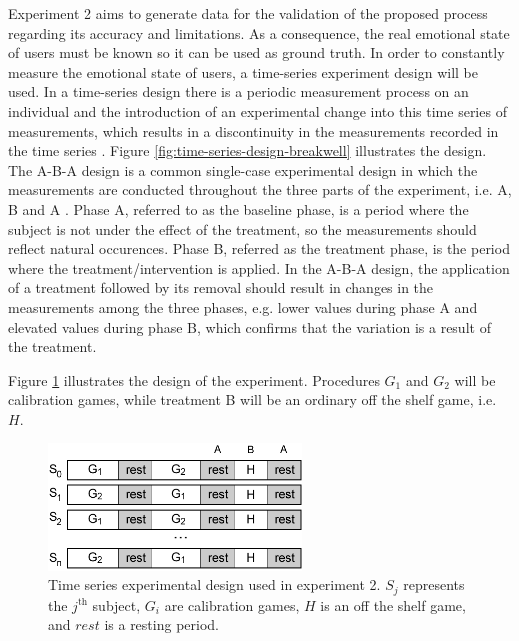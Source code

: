 Experiment 2 aims to generate data for the validation of the proposed process regarding its accuracy and limitations. As a consequence, the real emotional state of users must be known so it can be used as ground truth. In order to constantly measure the emotional state of users, a time-series experiment design will be used. In a time-series design there is a periodic measurement process on an individual and the introduction of an experimental change into this time series of measurements, which results in a discontinuity in the measurements recorded in the time series \parencite{campbell2015experimental}. Figure \ref{fig:time-series-design-breakwell} illustrates the design. The A-B-A design is a common single-case experimental design in which the measurements are conducted throughout the three parts of the experiment, i.e. A, B and A \parencite{robson2016real}. Phase A, referred to as the baseline phase, is a period where the subject is not under the effect of the treatment, so the measurements should reflect natural occurences. Phase B, referred as the treatment phase, is the period where the treatment/intervention is applied. In the A-B-A design, the application of a treatment followed by its removal should result in changes in the measurements among the three phases, e.g. lower values during phase A and elevated values during phase B, which confirms that the variation is a result of the treatment.

Figure \ref{fig:closing-experiment2-design} illustrates the design of the experiment. Procedures $G_1$ and $G_2$ will be calibration games, while treatment B will be an ordinary off the shelf game, i.e. $H$.

\begin{figure}[ht]
    \centering
    \includegraphics[width=0.6\textwidth]{figures/closing-experiment2-design.png}
    \caption{Time series experimental design used in experiment 2. $S_j$ represents the $j^{\text{th}}$ subject, $G_i$ are calibration games, $H$ is an off the shelf game, and $rest$ is a resting period.}
    \label{fig:closing-experiment2-design}
\end{figure}

